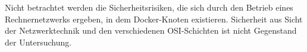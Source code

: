 \documentclass[../main.tex]{subfiles}
\begin{document}
  Nicht betrachtet werden die Sicherheitsrisiken, die sich durch den Betrieb eines Rechnernetzwerks ergeben, in dem Docker-Knoten existieren. Sicherheit aus Sicht der Netzwerktechnik und den verschiedenen \acrshort{OSI}-Schichten ist nicht Gegenstand der Untersuchung.


\end{document}
